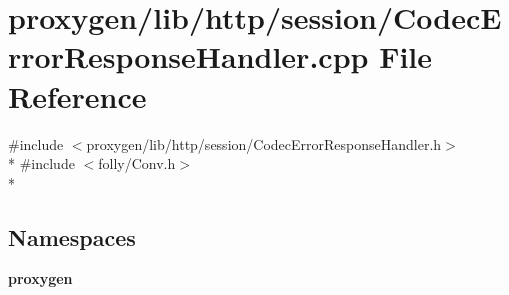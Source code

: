 \section{proxygen/lib/http/session/\+Codec\+Error\+Response\+Handler.cpp File Reference}
\label{CodecErrorResponseHandler_8cpp}
{\ttfamily \#include $<$proxygen/lib/http/session/\+Codec\+Error\+Response\+Handler.\+h$>$}\\*
{\ttfamily \#include $<$folly/\+Conv.\+h$>$}\\*
\subsection*{Namespaces}
\begin{DoxyCompactItemize}
\item 
 {\bf proxygen}
\end{DoxyCompactItemize}
